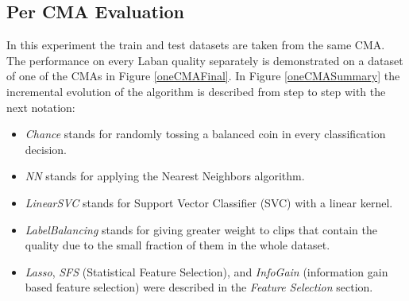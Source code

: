 \documentclass[journal]{journal}
\begin{document}
\subsection{Per CMA Evaluation}
	In this experiment the train and test datasets are taken from the same
	CMA. The performance on every Laban quality separately 	is demonstrated on 
	a dataset of one of the CMAs in Figure \ref{oneCMAFinal}.
	In Figure \ref{oneCMASummary} the incremental evolution of the algorithm is 
	described from step to step with the next notation:
	\begin{itemize}
	\item 
	\textit{Chance} stands for randomly tossing a balanced coin in every
	classification decision.
	\item 
	\textit{NN} stands for applying the Nearest Neighbors algorithm.
	\item 
	\textit{LinearSVC} stands for Support Vector Classifier (SVC) with a linear
	kernel.
	\item 
	\textit{LabelBalancing} stands for giving greater weight to clips that
	contain the quality due to the small fraction of them in the whole
	dataset.
	\item 
	\textit{Lasso}, \textit{SFS} (Statistical Feature Selection), and \textit{InfoGain} 
	(information gain based feature selection) were described in the
	\textit{Feature Selection} section.
	\end{itemize}

\end{document}
